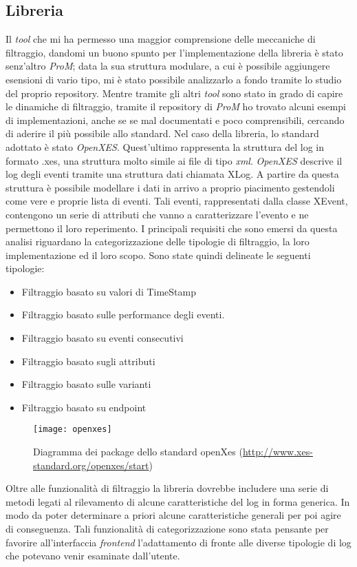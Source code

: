 \subsection{Libreria}
 Il \textit{tool} che mi ha permesso una maggior comprensione delle meccaniche di filtraggio, dandomi un buono spunto per l'implementazione della libreria è stato senz'altro \textit{ProM}; data la sua struttura modulare, a cui è possibile aggiungere esensioni di vario tipo, mi è stato possibile analizzarlo a fondo tramite lo studio del proprio repository. Mentre tramite gli altri \textit{tool} sono stato in grado di capire le dinamiche di filtraggio, tramite il repository di \textit{ProM} ho trovato alcuni esempi di implementazioni, anche se se mal documentati e poco comprensibili, cercando di aderire il più possibile allo standard. Nel caso della libreria, lo standard adottato è stato \textit{OpenXES}. Quest'ultimo rappresenta la struttura del log in formato .xes, una struttura molto simile ai file di tipo \textit{xml}. \textit{OpenXES} descrive il log degli eventi tramite una struttura dati chiamata XLog. A partire da questa struttura è possibile modellare i dati in arrivo a proprio piacimento gestendoli come vere e proprie lista di eventi. Tali eventi, rappresentati dalla classe XEvent, contengono un serie di attributi che vanno a caratterizzare l'evento e ne permettono il loro reperimento. I principali requisiti che sono emersi da questa analisi riguardano la categorizzazione delle tipologie di filtraggio, la loro implementazione ed il loro scopo. Sono state quindi delineate le seguenti tipologie:
\begin{itemize}
	\item Filtraggio basato su valori di TimeStamp
	\item Filtraggio basato sulle performance degli eventi.
	\item Filtraggio basato su eventi consecutivi
	\item Filtraggio basato sugli attributi
	\item Filtraggio basato sulle varianti
	\item Filtraggio basato su endpoint
\end{itemize}
\begin{figure}[!h] 
	\centering 
	\texttt{[image: openxes]} 
	\caption{Diagramma dei package dello standard openXes (\url{http://www.xes-standard.org/openxes/start})}
\end{figure}
Oltre alle funzionalità di filtraggio la libreria dovrebbe includere una serie di metodi legati al rilevamento di alcune caratteristiche del log in forma generica. In modo da poter determinare a priori alcune caratteristiche generali per poi agire di conseguenza.
Tali funzionalità di categorizzazione sono stata pensante per favorire all'interfaccia \textit{frontend} l'adattamento di fronte alle diverse tipologie di log che potevano venir esaminate dall'utente.
